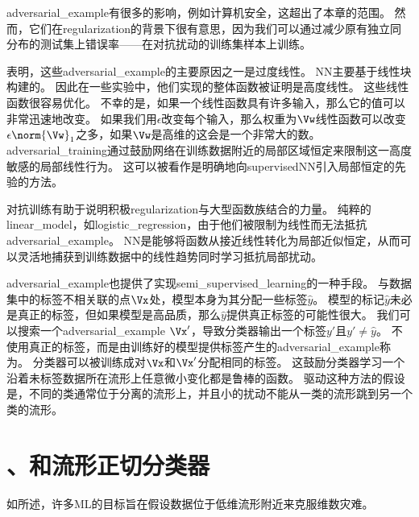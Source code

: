 
\gls{adversarial_example}有很多的影响，例如计算机安全，这超出了本章的范围。
然而，它们在\gls{regularization}的背景下很有意思，因为我们可以通过减少原有独立同分布的测试集上错误率——在对抗扰动的训练集样本上训练\citep{Szegedy-ICLR2014,Goodfellow-2015-adversarial}。


\cite{Goodfellow-2015-adversarial}表明，这些\gls{adversarial_example}的主要原因之一是过度线性。
\gls{NN}主要基于线性块构建的。
因此在一些实验中，他们实现的整体函数被证明是高度线性。
这些线性函数很容易优化。
不幸的是，如果一个线性函数具有许多输入，那么它的值可以非常迅速地改变。
如果我们用$\epsilon$改变每个输入，那么权重为$\Vw$线性函数可以改变$\epsilon \norm{\Vw}_1$之多，如果$\Vw$是高维的这会是一个非常大的数。
\gls{adversarial_training}通过鼓励网络在训练数据附近的局部区域恒定来限制这一高度敏感的局部线性行为。
这可以被看作是明确地向\gls{supervised}\gls{NN}引入局部恒定的先验的方法。

对抗训练有助于说明积极\gls{regularization}与大型函数族结合的力量。
纯粹的\gls{linear_model}，如\gls{logistic_regression}，由于他们被限制为线性而无法抵抗\gls{adversarial_example}。
\gls{NN}是能够将函数从接近线性转化为局部近似恒定，从而可以灵活地捕获到训练数据中的线性趋势同时学习抵抗局部扰动。

\gls{adversarial_example}也提供了实现\gls{semi_supervised_learning}的一种手段。
与数据集中的标签不相关联的点$\Vx$处，模型本身为其分配一些标签$\hat y$。
模型的标记$\hat y$未必是真正的标签，但如果模型是高品质，那么$\hat y$提供真正标签的可能性很大。
我们可以搜索一个\gls{adversarial_example} $\Vx'$，导致分类器输出一个标签$y'$且$y' \neq \hat y$。
不使用真正的标签，而是由训练好的模型提供标签产生的\gls{adversarial_example}称为\citep{miyato2015distributional}。
分类器可以被训练成对$\Vx$和$\Vx'$分配相同的标签。
这鼓励分类器学习一个沿着未标签数据所在流形上任意微小变化都是鲁棒的函数。
驱动这种方法的假设是，不同的类通常位于分离的流形上，并且小的扰动不能从一类的流形跳到另一个类的流形。


\section{、和流形正切分类器}
\label{sec:tangent_distance_tangent_prop_and_manifold_tangent_classifier}
如所述，许多\gls{ML}的目标旨在假设数据位于低维流形附近来克服维数灾难。

